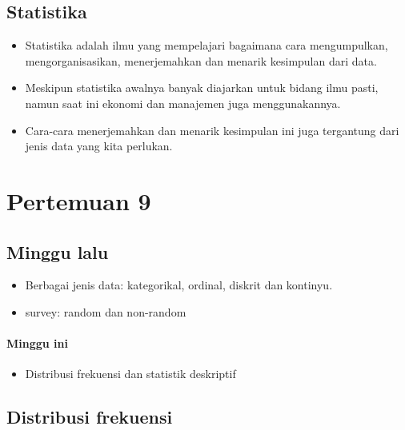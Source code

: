 \documentclass[
  letterpaper,
  DIV=11,
  numbers=noendperiod]{scrartcl}
\let\oldparagraph\paragraph
\renewcommand{\paragraph}[1]{\oldparagraph{#1}\mbox{}}
\providecommand{\tightlist}{%
  \setlength{\itemsep}{0pt}\setlength{\parskip}{0pt}}\usepackage{longtable,booktabs,array}
\begin{document}
\hypertarget{statistika}{%
\subsection{Statistika}\label{statistika}}

\begin{itemize}
\item
  Statistika adalah ilmu yang mempelajari bagaimana cara mengumpulkan,
  mengorganisasikan, menerjemahkan dan menarik kesimpulan dari data.
\item
  Meskipun statistika awalnya banyak diajarkan untuk bidang ilmu pasti,
  namun saat ini ekonomi dan manajemen juga menggunakannya.
\item
  Cara-cara menerjemahkan dan menarik kesimpulan ini juga tergantung
  dari jenis data yang kita perlukan.
\end{itemize}

\hypertarget{pertemuan-9}{%
\section{Pertemuan 9}\label{pertemuan-9}}

\hypertarget{minggu-lalu-2}{%
\subsection{Minggu lalu}\label{minggu-lalu-2}}

\begin{itemize}
\item
  Berbagai jenis data: kategorikal, ordinal, diskrit dan kontinyu.
\item
  survey: random dan non-random
\end{itemize}

\hypertarget{minggu-ini}{%
\paragraph{Minggu ini}\label{minggu-ini}}

\begin{itemize}
\tightlist
\item
  Distribusi frekuensi dan statistik deskriptif
\end{itemize}

\hypertarget{distribusi-frekuensi}{%
\subsection{Distribusi frekuensi}\label{distribusi-frekuensi}}
\end{document}
